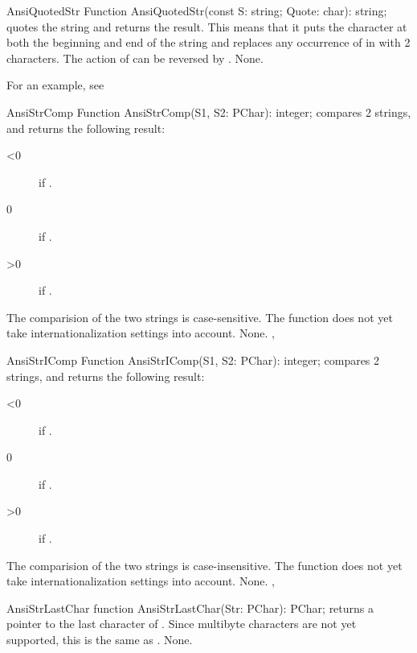 

\begin{function}{AnsiQuotedStr}
\Declaration
Function AnsiQuotedStr(const S: string; Quote: char): string;
\Description
{} quotes the string  and returns the result.
This means that it puts the  character at both the beginning and
end of the string and replaces any occurrence of  in 
with 2  characters. The action of  can be
reversed by .
\Errors
None.
\SeeAlso
{}
\end{function}

For an example, see 

\begin{function}{AnsiStrComp}
\Declaration
Function AnsiStrComp(S1, S2: PChar): integer;
\Description
{} compares 2  strings, and returns the following
result:
\begin{description}
\item[<0]  if .
\item[0]  if .
\item[>0]  if .
\end{description}
The comparision of the two strings is case-sensitive.
The function does not yet take internationalization settings into account.
\Errors
None.
\SeeAlso
{}, 
\end{function}



\begin{function}{AnsiStrIComp}
\Declaration
Function AnsiStrIComp(S1, S2: PChar): integer;
\Description
{} compares 2  strings, and returns the following
result:
\begin{description}
\item[<0]  if .
\item[0]  if .
\item[>0]  if .
\end{description}
The comparision of the two strings is case-insensitive.
The function does not yet take internationalization settings into account.
\Errors
None.
\SeeAlso
{}, 
\end{function}



\begin{function}{AnsiStrLastChar}
\Declaration
function AnsiStrLastChar(Str: PChar): PChar;
\Declaration
{} returns a pointer to the last character of .
Since multibyte characters are not yet supported, this is the same
as .
\Errors
None.
\SeeAlso
{}
\end{function}

